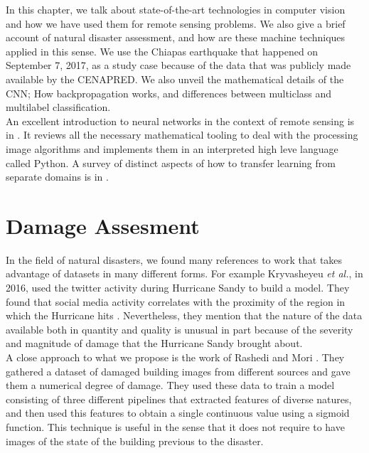 In this chapter, we talk about state-of-the-art technologies in computer vision and how we have used them for remote sensing problems. We also give a brief account of natural disaster assessment, and how are these machine techniques applied in this sense. We use the Chiapas earthquake that happened on September 7, 2017, as a study case because of the data that was publicly made available by the CENAPRED. We also unveil the mathematical details of the CNN; How backpropagation works, and differences between multiclass and multilabel classification.\\

An excellent introduction to neural networks in the context of remote sensing is in \cite{canty2014image}. It reviews all the necessary mathematical tooling to deal with the processing image algorithms and implements them in an interpreted high leve language called Python. A survey of distinct aspects of how to transfer learning from separate domains is in \cite{5288526}.\\

\section{Damage Assesment}

In the field of natural disasters, we found many references to work that takes advantage of datasets in many different forms. For example Kryvasheyeu \textit{et al.}, in 2016, used the twitter activity during  Hurricane Sandy to build a model. They found that social media activity correlates with the proximity of the region in which the Hurricane hits \cite{Kryvasheyeue1500779}. Nevertheless, they mention that the nature of the data available both in quantity and quality is unusual in part because of the severity and magnitude of damage that the Hurricane Sandy brought about.\\

A close approach to what we propose is the work of Rashedi and Mori \cite{Nia2017BuildingDA}. They gathered a dataset of damaged building images from different sources and gave them a numerical degree of damage. They used these data to train a model consisting of three different pipelines that extracted features of diverse natures, and then used this features to obtain a single continuous value using a sigmoid function. This technique is useful in the sense that it does not require to have images of the state of the building previous to the disaster.\\


